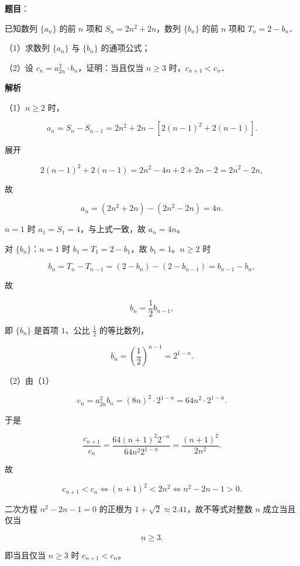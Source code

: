 \begin{answer}

\textbf{题目}：

已知数列 $\{a_n\}$ 的前 $n$ 项和 $S_n=2n^2+2n$，数列 $\{b_n\}$ 的前 $n$ 项和 $T_n=2-b_n$．

（1）求数列 $\{a_n\}$ 与 $\{b_n\}$ 的通项公式；

（2）设 $c_n=a_{2n}^2\cdot b_n$，证明：当且仅当 $n\geqslant3$ 时，$c_{n+1}<c_n$．

\textbf{解析}

（1）$n\geqslant2$ 时，

\nopagebreak[4]
\[a_n=S_n-S_{n-1}=2n^2+2n-\left[2(n-1)^2+2(n-1)\right].\]

展开

\nopagebreak[4]
\[2(n-1)^2+2(n-1)=2n^2-4n+2+2n-2=2n^2-2n,\]

故

\nopagebreak[4]
\[a_n=(2n^2+2n)-(2n^2-2n)=4n .\]

$n=1$ 时 $a_1=S_1=4$，与上式一致，故 $a_n=4n$。

对 $\{b_n\}$：$n=1$ 时 $b_1=T_1=2-b_1$，故 $b_1=1$。$n\geqslant2$ 时

\nopagebreak[4]
\[b_n=T_n-T_{n-1}=(2-b_n)-(2-b_{n-1})=b_{n-1}-b_n,\]

故

\nopagebreak[4]
\[b_n=\frac12 b_{n-1},\]

即 $\{b_n\}$ 是首项 $1$、公比 $\frac12$ 的等比数列，

\nopagebreak[4]
\[b_n=\left(\frac12\right)^{n-1}=2^{1-n}.\]

（2）由（1）

\nopagebreak[4]
\[c_n=a_{2n}^2b_n=(8n)^2\cdot2^{1-n}=64n^2\cdot2^{1-n}.\]

于是

\nopagebreak[4]
\[\frac{c_{n+1}}{c_n}=\frac{64(n+1)^2 2^{-n}}{64n^2 2^{1-n}}=\frac{(n+1)^2}{2n^2}.\]

故

\nopagebreak[4]
\[c_{n+1}<c_n\iff (n+1)^2<2n^2\iff n^2-2n-1>0 .\]

二次方程 $n^2-2n-1=0$ 的正根为 $1+\sqrt2\approx2.41$，故不等式对整数 $n$ 成立当且仅当

\nopagebreak[4]
\[n\geqslant3 .\]

即当且仅当 $n\geqslant3$ 时 $c_{n+1}<c_n$。


\end{answer}
